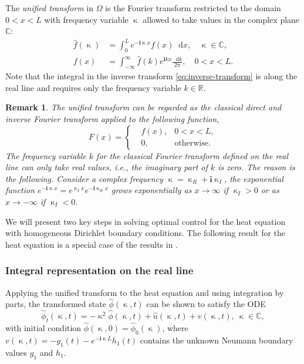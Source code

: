 \documentclass[journal,twoside,web]{ieeecolor}
\newtheorem{remark}{Remark}
\newcommand{\RR}{\mathbb{R}}
\newcommand{\CC}{\mathbb{C}}
\newcommand{\state}{\phi}
\newcommand{\statehat}{\hat{\state}}
\newcommand{\im}{\mathbf{i}}
\newcommand*\diff{\mathop{}\!\mathrm{d}}
\newcommand{\kcomplex}{\upkappa}
\begin{document}
The \textit{unified transform} in $\Omega$ is the Fourier transform restricted to the domain $0<x<L$ with frequency variable $\kcomplex$ allowed to take values in the complex plane $\CC$:
 	\begin{align}\label{eq:unified-transform}
 		 	\hat{f}(\kcomplex)&=\int_{0}^{L}e^{-\im \kcomplex x}f(x)\diff x, \quad \kcomplex\in\CC, \, \\ \label{eq:inverse-transform}
 		 	f(x)&=\int_{-\infty}^{\infty}\hat{f}(k)e^{\im kx}\frac{\diff k}{2\pi}, \quad 0< x<L.
 	\end{align}
Note that the integral in the inverse transform \eqref{eq:inverse-transform} is along the real line and requires only the frequency variable $k\in\RR$.
\begin{remark}
	The unified transform can be regarded as the classical direct and inverse Fourier transform applied to the following function,
	\begin{equation*}
		F(x)=\left\{
		\begin{aligned}
			&f(x), &0< x<L, \\
			&0, & \text{otherwise}.
		\end{aligned}
		\right.
	\end{equation*} 
	The frequency variable $k$ for the classical Fourier transform defined on the real line can only take real values, i.e., the imaginary part of $k$ is zero.
	The reason is the following.
	Consider a complex frequency $\kcomplex =\kcomplex_R + \im \kcomplex_I$, the exponential function $e^{-\im \kcomplex x}=e^{\kcomplex_I x}e^{-\im \kcomplex_R x}$ grows exponentially as $x\to\infty$ if $\kcomplex_I> 0$ or as $x\to-\infty$ if $\kcomplex_I<0$. 
\end{remark}

We will present two key steps in solving optimal control for the heat equation with homogeneous Dirichlet boundary conditions. 
The following result for the heat equation is a special case of the results in .
\subsubsection{Integral representation on the real line}
Applying the unified transform to the heat equation and using integration by parts, the transformed state $\statehat(\kcomplex,t)$ can be shown to satisfy the ODE 
\begin{equation}\label{eq:ode-heat-frequency}
		\hat{\state}_t(\kcomplex,t) = -\kcomplex^2\hat{\state}(\kcomplex,t) + \hat{u}(\kcomplex,t) + v(\kcomplex,t),\ \kcomplex \in \CC,
\end{equation}
with initial condition $\hat{\state}(\kcomplex,0)=\hat{\state}_0(\kcomplex)$, where $v(\kcomplex,t)=-g_1(t) - e^{-\im \kcomplex L}h_1(t)$ contains the unknown Neumann boundary values $g_1$ and $h_1$.
\end{document}
